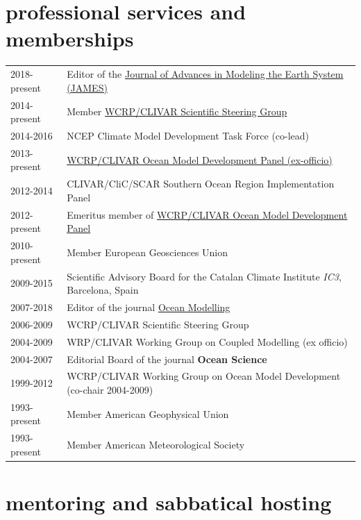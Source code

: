 \documentclass{article}
\begin{document}
\section*{\sc  \color{Maroon}  professional services and memberships}
\vspace{-.25cm}

\begin{tabular}{ll}
2018-present & Editor of the  \href{http://agupubs.onlinelibrary.wiley.com/hub/journal/10.1002/(ISSN)1942-2466/editorial-board/editorial-board.html}{Journal of Advances in Modeling the Earth System (JAMES)}  \\
2014-present &  Member  \href{http://www.clivar.org/organization/ssg}{WCRP/CLIVAR Scientific Steering Group} \\
2014-2016     & NCEP Climate Model Development Task Force (co-lead) \\
2013-present & \href{http://www.clivar.org/clivar-panels/omdp}{WCRP/CLIVAR Ocean Model Development Panel (ex-officio)} \\
2012-2014     & CLIVAR/CliC/SCAR Southern Ocean Region Implementation Panel \\
2012-present & Emeritus member of \href{http://www.clivar.org/clivar-panels/omdp}{WCRP/CLIVAR Ocean Model Development Panel} \\
2010-present & Member European Geosciences Union \\
2009-2015     &  Scientific Advisory Board for the Catalan  Climate Institute {\it IC3}, Barcelona, Spain \\
2007-2018 & Editor of the journal \href{https://www.journals.elsevier.com/ocean-modelling/editorial-board}{Ocean Modelling}  \\
2006-2009     &  WCRP/CLIVAR Scientific Steering Group \\
2004-2009     &  WRP/CLIVAR Working Group on Coupled Modelling (ex officio) \\
2004-2007     & Editorial Board of the journal {\bf Ocean Science} \\
1999-2012     & WCRP/CLIVAR Working Group on Ocean Model Development  (co-chair 2004-2009) \\
1993-present  & Member American Geophysical Union \\
1993-present  & Member American Meteorological Society \\
\end{tabular}


\section*{\sc  \color{Maroon} mentoring and sabbatical hosting}
\vspace{-.25cm}
\end{document}
